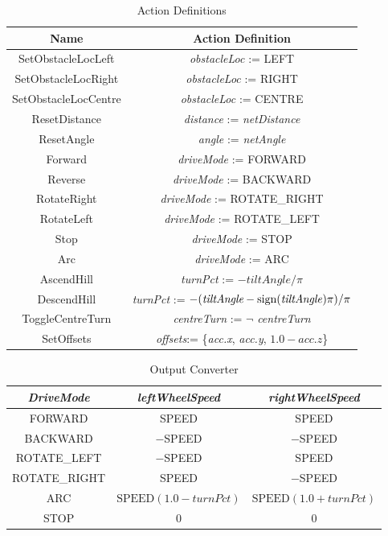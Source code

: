 \begin{table}[p]
    \centering
    \begin{tabular}{|c|c|}
        \hline
        Name        & Action Definition \\
        \hline\hline
        SetObstacleLocLeft & \textit{obstacleLoc} := LEFT \\
        \hline
        SetObstacleLocRight & \textit{obstacleLoc} := RIGHT \\
        \hline
        SetObstacleLocCentre & \textit{obstacleLoc} := CENTRE \\
        \hline
        ResetDistance & \textit{distance} := \textit{netDistance}\\
        \hline
        ResetAngle & \textit{angle} := \textit{netAngle}\\
        \hline
        Forward & \textit{driveMode} := FORWARD \\
        \hline
        Reverse & \textit{driveMode} := BACKWARD \\
        \hline
        RotateRight & \textit{driveMode} := ROTATE\_RIGHT \\
        \hline
        RotateLeft & \textit{driveMode} := ROTATE\_LEFT \\
        \hline
        Stop & \textit{driveMode} := STOP \\
        \hline
        Arc & \textit{driveMode} := ARC \\
        \hline
        AscendHill & \textit{turnPct} := $-\textit{tiltAngle}/\pi$\\
        \hline
        DescendHill & \textit{turnPct} := $-(\textit{tiltAngle}-\text{sign(\textit{tiltAngle})}\pi)/\pi$\\
        \hline
        ToggleCentreTurn & \textit{centreTurn} := $\neg$ \textit{centreTurn}\\
        \hline
        SetOffsets & \textit{offsets}:= \{\textit{acc.x}, \textit{acc.y}, $1.0-\textit{acc.z}$\}\\
        \hline
    \end{tabular}
    \caption{Action Definitions}
    \label{tab:actions}
\end{table}

\begin{table}[p]
    \centering
    \begin{tabular}{|c|c|c|}
        \hline
        \textit{DriveMode}  & \textit{leftWheelSpeed} & \textit{rightWheelSpeed} \\
        \hline\hline
        FORWARD & SPEED & SPEED \\
        \hline
        BACKWARD & $-$SPEED & $-$SPEED \\
        \hline
        ROTATE\_LEFT & $-$SPEED & SPEED \\
        \hline
        ROTATE\_RIGHT & SPEED & $-$SPEED \\
        \hline
        ARC & $\text{SPEED}(1.0-\textit{turnPct})$ & $\text{SPEED}(1.0+\textit{turnPct})$ \\
        \hline
        STOP & 0 & 0\\
        \hline
    \end{tabular}
    \caption{Output Converter}
    \label{tab:outputs}
\end{table}